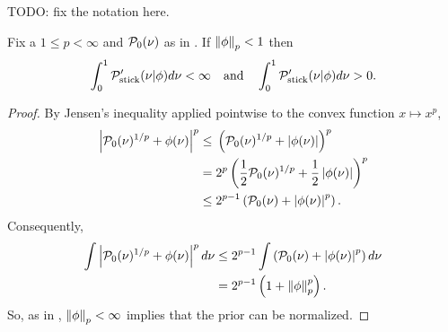 \begin{lem}
%
TODO: fix the notation here.

Fix a $1 \le p < \infty$ and $\mathcal{P}_{0}(\nu)$ as in .
If $\left\Vert\phi\right\Vert_p < 1$ then
%
\begin{align*}
%
\int_0^1 \pstick'(\nu \vert \phi) d\nu < \infty
\mathtxt{and}
\int_0^1 \pstick'(\nu \vert \phi) d\nu > 0.
%
\end{align*}
%
\begin{proof}
%
By Jensen's inequality applied pointwise to the convex function $x \mapsto
x^p$,
%
\begin{align*}
%
\abs{\pbase(\nu)^{1/p} + \phi(\nu) }^{p} \le{}&
    \left(\pbase(\nu)^{1/p} + \abs{\phi(\nu)} \right)^{p}
\\={}&
    2^p \left(\frac{1}{2}\pbase(\nu)^{1/p} +
              \frac{1}{2} \abs{\phi(\nu)} \right)^{p}
\\\le{}&
    2^{p-1} \left(\pbase(\nu) + \abs{\phi(\nu)}^p \right).
%
\end{align*}
%
Consequently,
%
\begin{align*}
%
\int \abs{\pbase(\nu)^{1/p} + \phi(\nu) }^{p} d\nu \le{}&
    2^{p-1} \int \left(\pbase(\nu) + \abs{\phi(\nu)}^p \right) d\nu
\\={}&
    2^{p-1} \left(1 + \norm{\phi}_p^p\right).
%
\end{align*}
%
So, as in \citep[Result 2]{gustafson:1996:local}, $\left\Vert\phi\right\Vert_p < \infty$
implies that the prior can be normalized.


\end{proof}
\end{lem}
